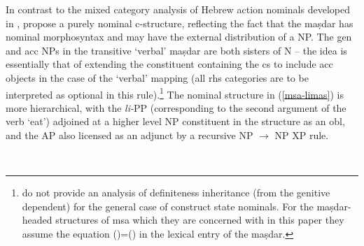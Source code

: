 \documentclass[output=paper,hidelinks]{langscibook}
\begin{document}
In contrast to the mixed category analysis of Hebrew action nominals developed in \citet{Falk01actnom,Falk07}, \citet{BMP:LFG15}  propose a purely nominal c-structure, reflecting the fact that the maṣdar has nominal morphosyntax and may have the external distribution of a NP.  The  {\sc gen} and {\sc acc} NPs in the transitive `verbal' maṣdar  are both sisters of N -- the idea is essentially that of extending the constituent containing the {\sc cs} to include {\sc acc} objects in the case of the `verbal' mapping (all {\sc rhs} categories are to be interpreted as optional in this rule).\footnote{\citet{BMP:LFG15} do not provide an analysis of definiteness inheritance (from the genitive dependent) for the general case of construct state nominals.  For the maṣdar-headed structures of {\sc msa} which they are concerned with in this paper they assume the equation \mbox{(\UP\DEF)=(\UP\SUBJ\DEF)} in the lexical entry of the maṣdar. }  The nominal structure in (\ref{msa-limas}) is more
hierarchical, with the {\em li-}PP (corresponding to the second argument of the verb `eat')  adjoined at a higher level  NP constituent in the structure  as an {\sc obl}, and the AP also licensed as an {\sc adj}unct  by a recursive NP $\rightarrow$ NP XP rule.

\ea \label{csrule-bmp}
 \\\citep[53]{BMP:LFG15}
\z
\end{document}
